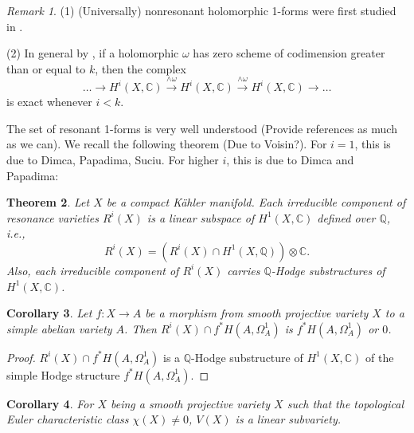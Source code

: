 \documentclass[a4paper,12pt,reqno]{amsart}
\newtheorem{theorem}{Theorem}[section]
\theoremstyle{plain}
\newtheorem{corollary}[theorem]{Corollary}
\theoremstyle{remark}
\newtheorem{remark}[theorem]{Remark}
\newcommand{\Q}{\mathbb Q}
\newcommand{\C}{\mathbb C}
\begin{document}
\begin{remark}

(1) (Universally) nonresonant  holomorphic 1-forms were first studied in \cite{SS19}.

(2) In general by \cite[Proposition 3.4]{GL87}, if a holomorphic $\omega$ has zero scheme of codimension greater than or equal to $k$, then the complex $$\ldots\to H^{i}(X,\C)\overset{\wedge\omega}{\rightarrow}H^{i}(X,\C)\overset{\wedge\omega}{\rightarrow}H^{i}(X,\C)\to\ldots$$ is exact whenever $i<k.$ 
\end{remark}

The set of resonant 1-forms is very well understood {\color{red} (Provide references as much as we can)}. We recall the following theorem {\color{red} (Due to Voisin?)}. For $i=1$, this is due to Dimca, Papadima, Suciu. For higher $i$, this is due to Dimca and Papadima:

\begin{theorem}{\cite[Theorem C, Corollary 1.7]{DiPa13}}\label{resonant}
Let $X$ be a compact K\"ahler manifold. Each irreducible component of resonance varieties $R^i(X)$ is a linear subspace of $H^1(X, \C)$ defined over $\Q$, i.e., $$R^i(X)=(R^i(X)\cap H^1(X, \Q))\otimes\C.$$ Also,  each irreducible component of $R^i(X)$ carries $\Q$-Hodge substructures of $H^1(X, \C)$.
\end{theorem} 

\begin{corollary}
Let $f:X\to A$ be a morphism from smooth projective variety $X$ to a simple abelian  variety $A$. Then $R^i(X)\cap f^*H(A, \Omega_A^1)$ is $f^*H(A, \Omega_A^1)$ or $0$.
\end{corollary}

\begin{proof}
$R^i(X)\cap f^*H(A, \Omega_A^1)$ is a $\Q$-Hodge substructure of $H^1(X, \C)$ of the simple Hodge structure $f^*H(A, \Omega_A^1)$.
\end{proof}

\begin{corollary}\label{ECNT}
For $X$ being a smooth projective variety $X$ such that the topological Euler characteristic class $\chi(X)\not=0$, $V(X)$ is a linear subvariety.
\end{corollary}


\end{document}
